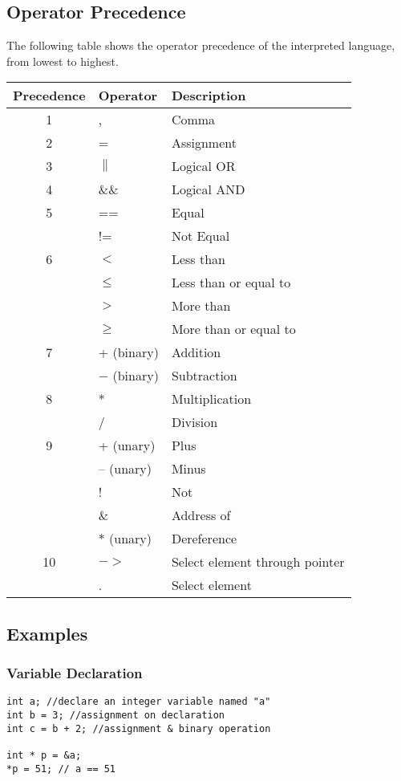 \documentclass{article}
\begin{document}
\subsection{Operator Precedence}
The following table shows the operator precedence of the interpreted language, from lowest to highest.

\begin{tabular}{| c | l | l |}
\hline
Precedence & Operator & Description \\ \hline
1 & , & Comma \\ \hline
2 & = & Assignment \\ \hline
3 & $\parallel$ & Logical OR \\ \hline
4 & \&\& & Logical AND \\ \hline
5 & == & Equal \\
  & != & Not Equal \\ \hline
6 & $<$ & Less than \\
  & $\leq$ & Less than or equal to \\
  & $>$ & More than \\
  & $\geq$ & More than or equal to \\ \hline
7 & + (binary) & Addition \\
  & $-$ (binary) & Subtraction \\ \hline
8 & * & Multiplication \\
  & / & Division \\ \hline
9 & + (unary) & Plus \\
  & -- (unary) & Minus \\
  & ! & Not \\
  & $\&$ & Address of \\
  & * (unary) & Dereference \\ \hline
10 & $-$$>$ & Select element through pointer \\
   & . & Select element \\ \hline

\end{tabular}

\subsection{Examples}

\subsubsection{Variable Declaration}

\begin{lstlisting}
int a; //declare an integer variable named "a"
int b = 3; //assignment on declaration
int c = b + 2; //assignment & binary operation

int * p = &a;
*p = 51; // a == 51
\end{lstlisting}
\end{document}
